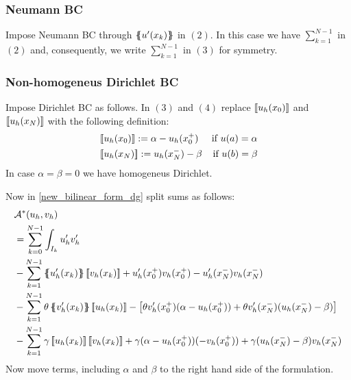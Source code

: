 \subsubsection*{Neumann BC}
Impose Neumann BC through \(\left\{\mspace{-6.5mu}\left\{u'(x_k)\right\}\mspace{-6.5mu}\right\}\) in \((2)\). In this case we have \(\sum_{k=1}^{N-1}\) in \((2)\) and, consequently, we write \(\sum_{k=1}^{N-1}\) in \((3)\) for symmetry.
\subsubsection*{Non-homogeneus Dirichlet BC}
Impose Dirichlet BC as follows. In \((3)\) and \((4)\) replace \(\left[\!\left[u_h(x_0)\right]\!\right]\) and \(\left[\!\left[u_h(x_N)\right]\!\right]\) with the following definition:
\begin{align*}
    &\left[\!\left[u_h(x_0)\right]\!\right] := \alpha - u_h(x_0^+) & \text{if } u(a) = \alpha \\
    &\left[\!\left[u_h(x_N)\right]\!\right] :=  u_h(x_N^-) - \beta & \text{if } u(b) = \beta
\end{align*}
In case \(\alpha =  \beta = 0\) we have homogeneus Dirichlet. 

Now in \eqref{new_bilinear_form_dg} split sums as follows: 
\begin{equation}
    \begin{split}        
    & \mathcal{A}^*(u_h, v_h)\\
    & = \sum_{k=0}^{N-1} \int_{I_k} u'_h v'_h \\
        & - \sum_{k=1}^{N-1} \average{u'_h(x_k)}\jump{v_h(x_k)} + u'_h(x_0^+)v_h(x_0^+) - u'_h(x_N^-)v_h(x_N^-) \\
        & - \sum_{k=1}^{N-1} \theta \average{v'_h(x_k)} \jump{u_h(x_k)} - \left[\theta v'_h(x^+_0)(\alpha - u_h(x^+_0)) + \theta v'_h(x^-_N)(u_h(x^-_N) - \beta)\right] \\
        & - \sum_{k=1}^{N-1} \gamma \jump{u_h(x_k)} \jump{v_h(x_k)} + \gamma(\alpha - u_h(x^+_0))(-v_h(x^+_0)) + \gamma (u_h(x_N^-) - \beta)v_h(x_N^-) \label{split_sum_bilinear_dg}
    \end{split}
\end{equation}
Now move terms, including \(\alpha\) and \(\beta\) to the right hand side of the formulation.

